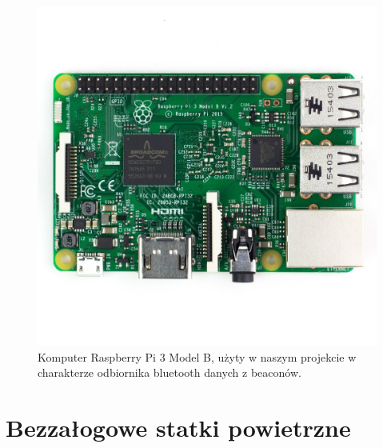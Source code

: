 \begin{figure}[!th]
    \centering
    \includegraphics[width=15cm]{zalaczniki/obrazy/raspberrypi3.jpg}
    \caption{Komputer Raspberry Pi 3 Model B, użyty w naszym projekcie w charakterze odbiornika bluetooth danych z beaconów.}
    \label{fig:raspberrypi3}
\end{figure}

\section{Bezzałogowe statki powietrzne}
